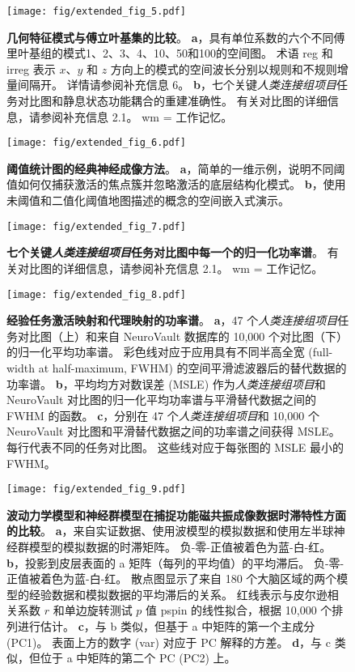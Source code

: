 \documentclass[lang=cn,a4paper,newtx,citestyle=gb7714-2015, bibstyle=gb7714-2015]{elegantpaper}
\begin{document}
\begin{figure}[!htb] 
	\centering
	\texttt{[image: fig/extended\_fig\_5.pdf]}
	\caption{\textbf{几何特征模式与傅立叶基集的比较}。
	\textbf{a}，具有单位系数的六个不同傅里叶基组的模式1、2、3、4、10、50和100的空间图。
	术语 reg 和 irreg 表示 $ x $、$ y $ 和 $ z $ 方向上的模式的空间波长分别以规则和不规则增量间隔开。
	详情请参阅补充信息 6。
	\textbf{b}，七个关键\textit{人类连接组项目}任务对比图和静息状态功能耦合的重建准确性。
	有关对比图的详细信息，请参阅补充信息 2.1。
	wm = 工作记忆。}
	\label{fig:extended_fig_5}
\end{figure}


\begin{figure}[!htb] 
	\centering
	\texttt{[image: fig/extended\_fig\_6.pdf]}
	\caption{\textbf{阈值统计图的经典神经成像方法}。
	\textbf{a}，简单的一维示例，说明不同阈值如何仅捕获激活的焦点簇并忽略激活的底层结构化模式。
	\textbf{b}，使用未阈值和二值化阈值地图描述的概念的空间嵌入式演示。}
	\label{fig:extended_fig_6}
\end{figure}


\begin{figure}[!htb] 
	\centering
	\texttt{[image: fig/extended\_fig\_7.pdf]}
	\caption{\textbf{七个关键\textit{人类连接组项目}任务对比图中每一个的归一化功率谱}。
	有关对比图的详细信息，请参阅补充信息 2.1。
	wm = 工作记忆。}
	\label{fig:extended_fig_7}
\end{figure}


\begin{figure}[!htb] 
	\centering
	\texttt{[image: fig/extended\_fig\_8.pdf]}
	\caption{\textbf{经验任务激活映射和代理映射的功率谱}。
	\textbf{a}，47 个\textit{人类连接组项目}任务对比图（上）和来自 NeuroVault 数据库的 10,000 个对比图（下）的归一化平均功率谱。
	彩色线对应于应用具有不同半高全宽 (full-width at
	half-maximum, FWHM) 的空间平滑滤波器后的替代数据的功率谱。
	\textbf{b}，平均均方对数误差 (MSLE) 作为\textit{人类连接组项目}和 NeuroVault 对比图的归一化平均功率谱与平滑替代数据之间的 FWHM 的函数。
	\textbf{c}，分别在 47 个\textit{人类连接组项目}和 10,000 个 NeuroVault 对比图和平滑替代数据之间的功率谱之间获得 MSLE。
	每行代表不同的任务对比图。
	这些线对应于每张图的 MSLE 最小的 FWHM。}
	\label{fig:extended_fig_8}
\end{figure}


\begin{figure}[!htb] 
	\centering
	\texttt{[image: fig/extended\_fig\_9.pdf]}
	\caption{\textbf{波动力学模型和神经群模型在捕捉功能磁共振成像数据时滞特性方面的比较}。
	\textbf{a}，来自实证数据、使用波模型的模拟数据和使用左半球神经群模型的模拟数据的时滞矩阵。
	负-零-正值被着色为蓝-白-红。
	\textbf{b}，投影到皮层表面的 a 矩阵（每列的平均值）的平均滞后。
	负-零-正值被着色为蓝-白-红。
	散点图显示了来自 180 个大脑区域的两个模型的经验数据和模拟数据的平均滞后的关系。
	红线表示与皮尔逊相关系数 $ r $ 和单边旋转测试 $ p $ 值 pspin 的线性拟合，根据 10,000 个排列进行估计。 
	\textbf{c}，与 b 类似，但基于 a 中矩阵的第一个主成分 (PC1)。
	表面上方的数字 (var) 对应于 PC 解释的方差。
	\textbf{d}，与 c 类似，但位于 a 中矩阵的第二个 PC (PC2) 上。}
	\label{fig:extended_fig_9}
\end{figure}
\end{document}
